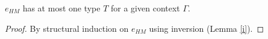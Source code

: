 \begin{lemma}
\label{uot}
\onehalfspacing
$e_{HM}$ has at most one type $T$ for a given context $\Gamma$.
\begin{proof}
By structural induction on $e_{HM}$ using inversion (Lemma \ref{i}).
\end{proof}
\end{lemma}